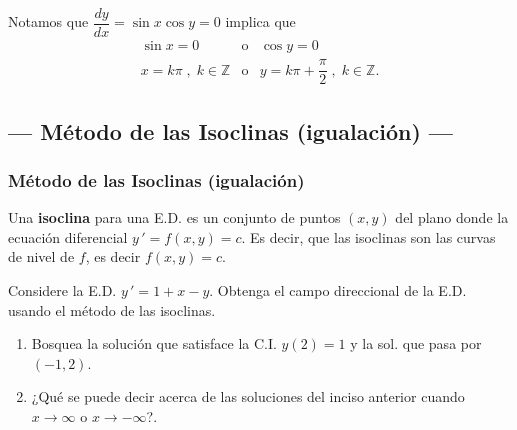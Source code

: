 \documentclass{beamer}
\begin{document}
\begin{frame}[t]
	\begin{exampleblock}{}
		Notamos que \alert{\(\dfrac{dy}{dx} = \sin x \cos y =0\)} implica que \vspace{-5mm}
		\[
			\begin{array}{rcl}
				\sin x=0 & \mbox{o} & \cos y=0 \\[2mm]
				x= k \pi \;,\; k \in \mathbb{Z} & \mbox{o} & y=k \pi + \dfrac{\pi}{2} \;,\; k \in \mathbb{Z} .
			\end{array}
		\]
	\end{exampleblock}
\end{frame}


\subsection{--- Método de las Isoclinas (igualación) ---} %

\begin{frame}[t]
	\frametitle{Método de las Isoclinas (igualación)}
	\begin{definition}
		Una \textbf{isoclina} para una E.D. es un conjunto de puntos \((x,y)\) del plano donde la ecuación diferencial \(y\,' = f(x,y) =c\). Es decir, que las isoclinas son las curvas de nivel de \(f\), es decir \alert{\(f(x,y) =c\).} 
	\end{definition}
	\begin{example}
		Considere la E.D. \(y\,' = 1+x-y\). Obtenga el campo direccional de la E.D. usando el método de las isoclinas.
		\begin{enumerate}
			\item Bosquea la solución que satisface la C.I. \(y(2) =1\) y la sol. que pasa por \((-1,2)\).
			\item ¿Qué se puede decir acerca de las soluciones del inciso anterior cuando \(x \longrightarrow \infty\) o \(x \longrightarrow - \infty\)?.
		\end{enumerate}
	\end{example}
\end{frame}
\end{document}
